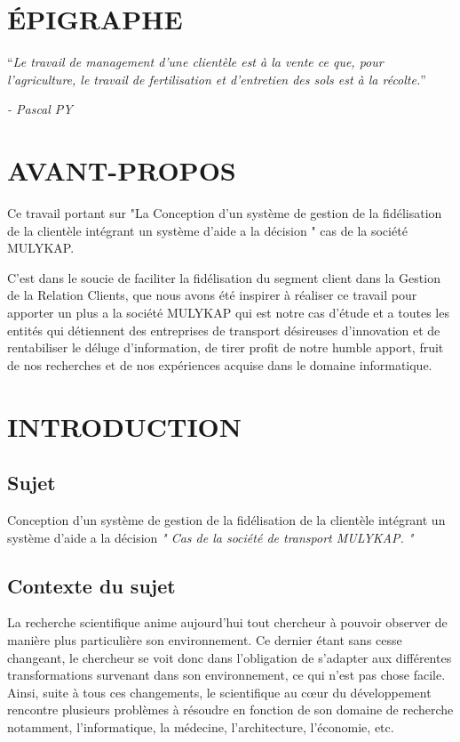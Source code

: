 \documentclass[a4paper,12pt,oneside]{book}
\begin{document}
\frontmatter
    \chapter*{ÉPIGRAPHE}
    \enquote{\it Le travail de management d’une clientèle est à la vente ce
    que, pour l’agriculture, le travail de fertilisation et
    d’entretien des sols est à la récolte.}
    \begin{flushright}
        \it - Pascal PY
    \end{flushright}
    
    \chapter*{AVANT-PROPOS}
    Ce travail portant sur "La Conception d’un système de gestion de la fidélisation
    de la clientèle intégrant un système d’aide a la décision
    " cas de la société MULYKAP.
    \newline

    C’est dans le soucie de faciliter la fidélisation du segment client
    dans la Gestion de la Relation Clients, que nous avons été inspirer
    à réaliser ce travail pour apporter un plus a la société MULYKAP
    qui est notre cas d’étude et a toutes les entités qui détiennent des entreprises
    de transport désireuses d’innovation et de rentabiliser le 
    déluge d’information, de tirer profit de notre humble apport, fruit
    de nos recherches et de nos expériences acquise dans le domaine informatique.

\mainmatter

    \chapter*{INTRODUCTION}
        \section[Sujet]{Sujet}
        Conception d’un système de gestion de la fidélisation
        de la clientèle intégrant un système d’aide a la décision
        \textit{" Cas de la société de transport MULYKAP. "}

        \section[Contexte du sujet]{Contexte du sujet}
        La recherche scientifique anime aujourd’hui tout chercheur
        à pouvoir observer de manière
        plus particulière son environnement. Ce dernier étant
        sans cesse changeant, le chercheur se voit donc
        dans l’obligation de s’adapter aux différentes transformations
        survenant dans son environnement, ce qui n’est pas chose facile.
        Ainsi, suite à tous ces changements, le scientifique au cœur du
        développement rencontre plusieurs problèmes à résoudre en
        fonction de son domaine de recherche notamment, l’informatique,
        la médecine, l’architecture, l’économie, etc.
        \newline
\end{document}
